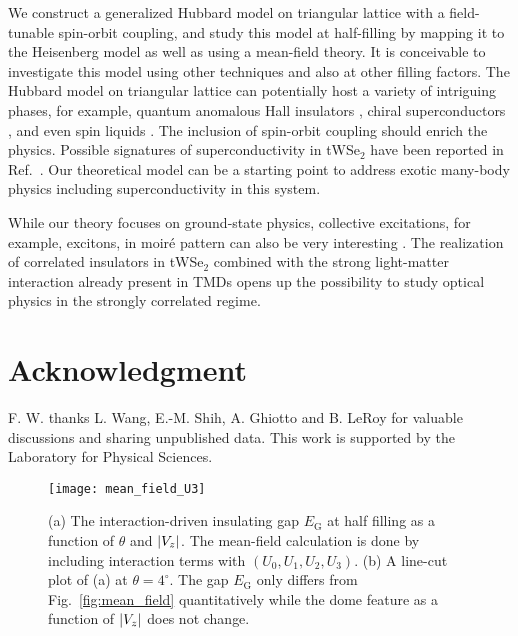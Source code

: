 \documentclass[aps,prx,floatfix,twocolumn]{revtex4-1}
\begin{document}
	We construct a generalized Hubbard model on triangular lattice with a field-tunable spin-orbit coupling, and study this model at half-filling by mapping it to the Heisenberg model as well as using a mean-field theory. It is conceivable to investigate this model using other techniques and also at other filling factors. The Hubbard model on triangular lattice can potentially host a variety of intriguing phases, for example,  quantum anomalous Hall insulators \cite{martin2008itinerant}, chiral superconductors \cite{nandkishore2014superconductivity},  and even spin liquids \cite{szasz2020chiral}. The inclusion of spin-orbit coupling should enrich the physics. Possible signatures of superconductivity in tWSe$_2$ have been reported in Ref.~\cite{wang2019magic}.  Our theoretical model can be a starting point to address exotic many-body physics including superconductivity in this system.
	
	While our theory focuses on ground-state physics, collective excitations, for example, excitons, in moir\'e pattern can also be very interesting \cite{wu2017topological,wu2018theory,tran2019evidence}. The realization of correlated insulators in tWSe$_2$ combined with the strong light-matter interaction already present in TMDs opens up the possibility to study optical physics in the strongly correlated regime.
	
    \section{Acknowledgment}
    F. W. thanks L. Wang, E.-M. Shih, A. Ghiotto and B. LeRoy for valuable discussions and sharing unpublished data. This work is supported by the Laboratory for Physical Sciences.

	\begin{figure}[b]
		\texttt{[image: mean\_field\_U3]}
		\caption{(a) The interaction-driven insulating gap $E_\text{G}$ at half filling as a function of $ \theta $ and $ \abs{V_z} $. The mean-field calculation is done by including interaction terms with $( U_0, U_1, U_2, U_3 )$. (b) A line-cut plot of (a) at $ \theta=4^\circ $. The gap $E_\text{G}$ only differs from Fig.~\ref{fig:mean_field} quantitatively while the dome feature as a function of $ \abs{V_z} $ does not change.}
		\label{fig:mean_field_U3}
	\end{figure}
	
	\appendix
\end{document}
